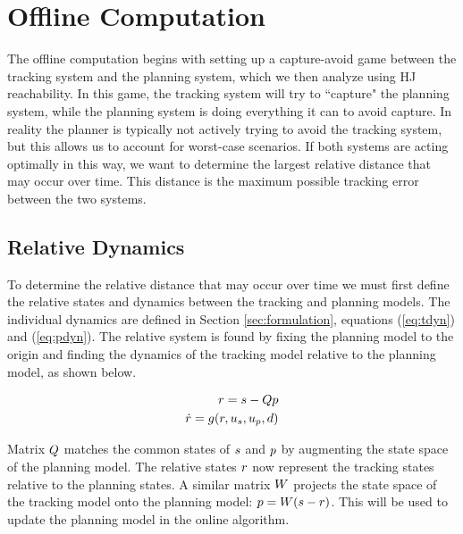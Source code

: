 \section{Offline Computation \label{sec:precomp}}
The offline computation begins with setting up a capture-avoid game between the tracking system and the planning system, which we then analyze using HJ reachability. In this game, the tracking system will try to ``capture" the planning system, while the planning system is doing everything it can to avoid capture. In reality the planner is typically not actively trying to avoid the tracking system, but this allows us to account for worst-case scenarios. If both systems are acting optimally in this way, we want to determine the largest relative distance that may occur over time. This distance is the maximum possible tracking error between the two systems.

\subsection{Relative Dynamics}
To determine the relative distance that may occur over time we must first define the relative states and dynamics between the tracking and planning models. The individual dynamics are defined in Section \ref{sec:formulation}, equations (\ref{eq:tdyn}) and (\ref{eq:pdyn}). The relative system is found by fixing the planning model to the origin and finding the dynamics of the tracking model relative to the planning model, as shown below.

\begin{equation}
\label{eq:rdyn}
\begin{aligned}
r = s - Qp\\
\dot{r} = g(r, u_s, u_p, d)
\end{aligned}
\end{equation}

Matrix $Q$ matches the common states of $s$ and $p$ by augmenting the state space of the planning model. The relative states $r$ now represent the tracking states relative to the planning states. A similar matrix $W$ projects the state space of the tracking model onto the planning model: $p = W(s-r)$. This will be used to update the planning model in the online algorithm.


